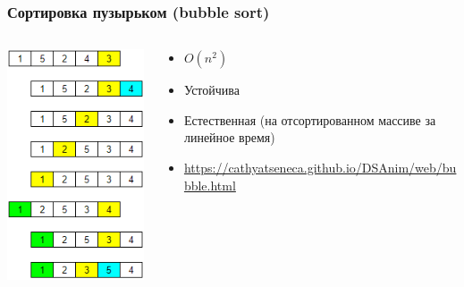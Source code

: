 \documentclass[xetex,mathserif,serif]{beamer}
\begin{document}
	\begin{frame}
		\frametitle{Сортировка пузырьком (bubble sort)}
		\begin{columns}
			\begin{column}{0.25\textwidth}
				\includegraphics[width=\textwidth]{bubbleSort.png}
			\end{column}
			\begin{column}{0.75\textwidth}
				\begin{itemize}
					\item $O(n^2)$
					\item Устойчива
					\item Естественная (на отсортированном массиве за линейное время)
					\item \url{https://cathyatseneca.github.io/DSAnim/web/bubble.html}
				\end{itemize}
			\end{column}
		\end{columns}
	\end{frame}
\end{document}
